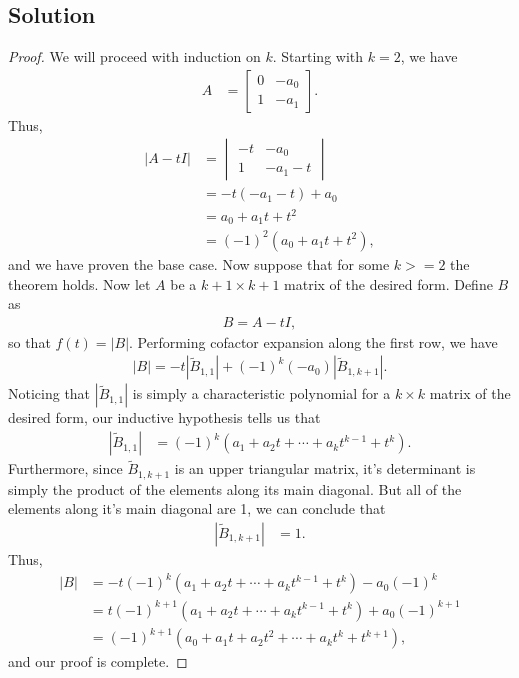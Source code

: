 \documentclass[10pt,a4paper]{article}
\theoremstyle{definition}
\begin{document}
\subsection*{Solution}
\begin{proof}
We will proceed with induction on $k$. Starting with $k = 2$, we have
\begin{align*}
A &= \begin{bmatrix}
0 & -a_0\\
1 & -a_1
\end{bmatrix}.
\end{align*}
Thus, 
\begin{align*}
|A - t I| &= \begin{vmatrix}
-t & -a_0\\
1 & -a_1 - t
\end{vmatrix}\\
&= -t(-a_1 - t) + a_0\\
&= a_0 + a_1 t + t^2\\
&= (-1)^2(a_0 + a_1 t + t^2),
\end{align*}
and we have proven the base case. Now suppose that for some $k >= 2$ the theorem holds. Now let $A$ be a $k+1 \times k+1$ matrix of the desired form. Define $B$ as 
\begin{align*}
B = A - tI,
\end{align*}
so that $f(t) = |B|$. Performing cofactor expansion along the first row, we have
\begin{align*}
|B| = -t |\tilde{B}_{1,1}| + (-1)^{k} (-a_0)  |\tilde{B}_{1,k+1}|.
\end{align*}
Noticing that $|\tilde{B}_{1,1}|$ is simply a characteristic polynomial for a $k \times k$ matrix of the desired form, our inductive hypothesis tells us that 
\begin{align*}
|\tilde{B}_{1,1}| &= (-1)^k(a_1 + a_2t + \cdots +a_{k}t^{k-1} + t^k).
\end{align*}
Furthermore, since $\tilde{B}_{1,k+1}$ is an upper triangular matrix, it's determinant is simply the product of the elements along its main diagonal. But all of the elements along it's main diagonal are 1, we can conclude that 
\begin{align*}
|\tilde{B}_{1,k+1}| &= 1.
\end{align*}
Thus, 
\begin{align*}
|B| &= -t (-1)^k(a_1 + a_2t + \cdots +a_{k}t^{k-1} + t^k) - a_0 (-1)^k\\
&= t (-1)^{k+1}(a_1 + a_2t + \cdots +a_{k}t^{k-1} + t^k) + a_0 (-1)^{k+1}\\
&= (-1)^{k+1}(a_0 + a_1 t + a_2 t^2 + \cdots +a_{k}t^{k} + t^{k+1}),
\end{align*}
and our proof is complete.
\end{proof}
\end{document}
